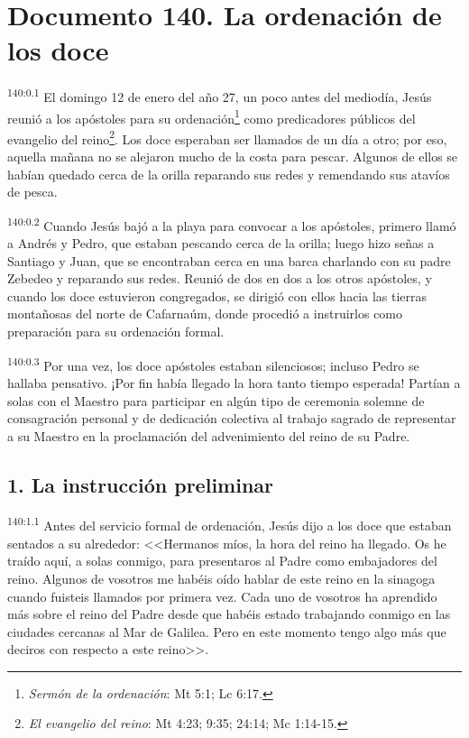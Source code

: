 \chapter{Documento 140. La ordenación de los doce}
\par 
\textsuperscript{140:0.1} El domingo 12 de enero del año 27, un poco antes del mediodía, Jesús reunió a los apóstoles para su ordenación\footnote{\textit{Sermón de la ordenación}: Mt 5:1; Lc 6:17.} como predicadores públicos del evangelio del reino\footnote{\textit{El evangelio del reino}: Mt 4:23; 9:35; 24:14; Mc 1:14-15.}. Los doce esperaban ser llamados de un día a otro; por eso, aquella mañana no se alejaron mucho de la costa para pescar. Algunos de ellos se habían quedado cerca de la orilla reparando sus redes y remendando sus atavíos de pesca.

\par 
\textsuperscript{140:0.2} Cuando Jesús bajó a la playa para convocar a los apóstoles, primero llamó a Andrés y Pedro, que estaban pescando cerca de la orilla; luego hizo señas a Santiago y Juan, que se encontraban cerca en una barca charlando con su padre Zebedeo y reparando sus redes. Reunió de dos en dos a los otros apóstoles, y cuando los doce estuvieron congregados, se dirigió con ellos hacia las tierras montañosas del norte de Cafarnaúm, donde procedió a instruirlos como preparación para su ordenación formal.

\par 
\textsuperscript{140:0.3} Por una vez, los doce apóstoles estaban silenciosos; incluso Pedro se hallaba pensativo. ¡Por fin había llegado la hora tanto tiempo esperada! Partían a solas con el Maestro para participar en algún tipo de ceremonia solemne de consagración personal y de dedicación colectiva al trabajo sagrado de representar a su Maestro en la proclamación del advenimiento del reino de su Padre.

\section*{1. La instrucción preliminar}
\par 
\textsuperscript{140:1.1} Antes del servicio formal de ordenación, Jesús dijo a los doce que estaban sentados a su alrededor: <<Hermanos míos, la hora del reino ha llegado. Os he traído aquí, a solas conmigo, para presentaros al Padre como embajadores del reino. Algunos de vosotros me habéis oído hablar de este reino en la sinagoga cuando fuisteis llamados por primera vez. Cada uno de vosotros ha aprendido más sobre el reino del Padre desde que habéis estado trabajando conmigo en las ciudades cercanas al Mar de Galilea. Pero en este momento tengo algo más que deciros con respecto a este reino>>.

